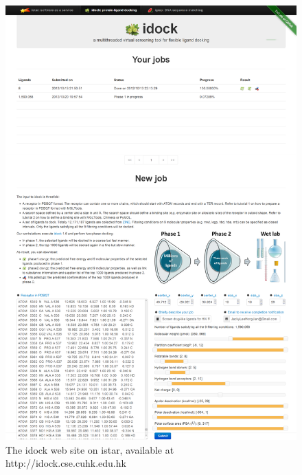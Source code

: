 \documentclass[12pt]{article}
\begin{document}
\begin{figure}
\begin{center}
\includegraphics[width=0.9\linewidth,keepaspectratio=true]{idock.png}
\caption{\label{idock} The idock web site on istar, available at http://idock.cse.cuhk.edu.hk}
\end{center}
\end{figure}

\clearpage
\end{document}
